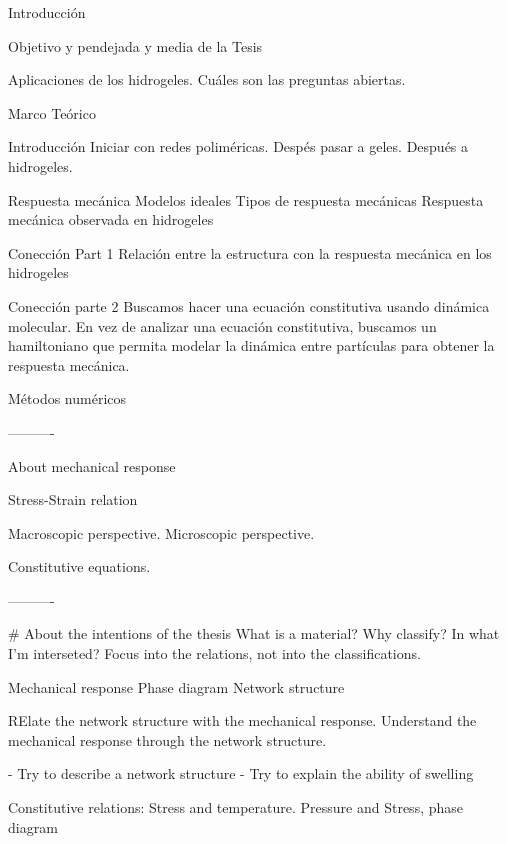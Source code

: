 Introducción

Objetivo y pendejada y media de la Tesis

Aplicaciones de los hidrogeles.
Cuáles son las preguntas abiertas.



Marco Teórico

Introducción
Iniciar con redes poliméricas.
Despés pasar a geles.
Después a hidrogeles.

Respuesta mecánica
Modelos ideales
Tipos de respuesta mecánicas
Respuesta mecánica observada en hidrogeles

Conección Part 1
Relación entre la estructura con la respuesta mecánica en los hidrogeles

Conección parte 2
Buscamos hacer una ecuación constitutiva usando dinámica molecular.
En vez de analizar una ecuación constitutiva, buscamos un hamiltoniano que permita modelar la dinámica entre partículas para obtener la respuesta mecánica.


Métodos numéricos

----------

About mechanical response

Stress-Strain relation

Macroscopic perspective.
Microscopic perspective.

Constitutive equations.

----------

# About the intentions of the thesis
What is a material?
Why classify?
In what I'm interseted?
Focus into the relations, not into the classifications.

Mechanical response
Phase diagram
Network structure

RElate the network structure with the mechanical response.
Understand the mechanical response through the network structure.

- Try to describe a network structure
- Try to explain the ability of swelling

Constitutive relations: Stress and temperature.
Pressure and Stress, phase diagram


































